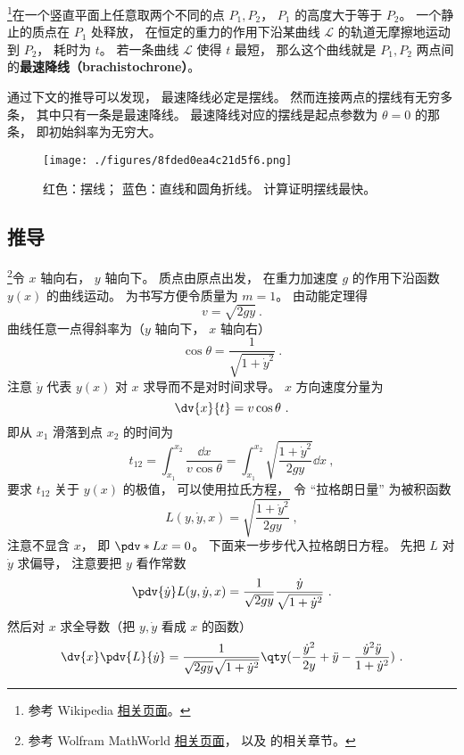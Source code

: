 

\footnote{参考 Wikipedia \href{https://en.wikipedia.org/wiki/Brachistochrone_curve}{相关页面}。}在一个竖直平面上任意取两个不同的点 $P_1, P_2$， $P_1$ 的高度大于等于 $P_2$。 一个静止的质点在 $P_1$ 处释放， 在恒定的重力的作用下沿某曲线 $\mathcal L$ 的轨道无摩擦地运动到 $P_2$， 耗时为 $t$。 若一条曲线 $\mathcal L$ 使得 $t$ 最短， 那么这个曲线就是 $P_1, P_2$ 两点间的\textbf{最速降线（brachistochrone）}。

通过下文的推导可以发现， 最速降线必定是摆线。 然而连接两点的摆线有无穷多条， 其中只有一条是最速降线。 最速降线对应的摆线是起点参数为 $\theta = 0$ 的那条， 即初始斜率为无穷大。

\begin{figure}[ht]
\centering
\texttt{[image: ./figures/8fded0ea4c21d5f6.png]}
\caption{红色：摆线； 蓝色：直线和圆角折线。 计算证明摆线最快。} \label{fig_Brachi_1}
\end{figure}

\subsection{推导}
\footnote{参考 Wolfram MathWorld \href{https://mathworld.wolfram.com/BrachistochroneProblem.html}{相关页面}， 以及 \cite{Goldstein} 的相关章节。}令 $x$ 轴向右， $y$ 轴向下。 质点由原点出发， 在重力加速度 $g$ 的作用下沿函数 $y(x)$ 的曲线运动。 为书写方便令质量为 $m = 1$。 由动能定理得
\begin{equation}
v = \sqrt{2gy}~.
\end{equation}
曲线任意一点得斜率为（$y$ 轴向下， $x$ 轴向右）
\begin{equation}
\cos\theta = \frac{1}{\sqrt{1 + \dot{y}^2}}~.
\end{equation}
注意 $\dot{y}$ 代表 $y(x)$ 对 $x$ 求导而不是对时间求导。 $x$ 方向速度分量为
\begin{equation}
\dv{x}{t} = v\cos\theta~.
\end{equation}
即从 $x_1$ 滑落到点 $x_2$ 的时间为
\begin{equation}\label{eq_Brachi_3}
t_{12} = \int_{x_1}^{x_2} \frac{\dd{x}}{v\cos\theta} = \int_{x_1}^{x_2} \sqrt{\frac{1 + \dot{y}^2}{2gy}} \dd{x}~,
\end{equation}
要求 $t_{12}$ 关于 $y(x)$ 的极值， 可以使用拉氏方程， 令 “拉格朗日量” 为被积函数
\begin{equation}
L(y, \dot y, x) = \sqrt{\frac{1 + \dot{y}^2}{2gy}}~,
\end{equation}
注意不显含 $x$， 即 $\pdv*{L}{x} = 0$。 下面来一步步代入拉格朗日方程。 先把 $L$ 对 $\dot{y}$ 求偏导， 注意要把 $y$ 看作常数
\begin{equation}
\pdv{\dot{y}}L(y, \dot{y}, x) = \frac{1}{\sqrt{2gy}}\frac{\dot{y}}{\sqrt{1 + \dot{y}^2}}~.
\end{equation}
然后对 $x$ 求全导数（把 $y, \dot{y}$ 看成 $x$ 的函数）
\begin{equation}
\dv{x}\pdv{L}{\dot{y}} = \frac{1}{\sqrt{2gy}\sqrt{1+\dot y^2}} \qty(-\frac{\dot y^2}{2y} + \ddot y - \frac{\dot y^2 \ddot y}{1 + \dot y^2})~.
\end{equation}


